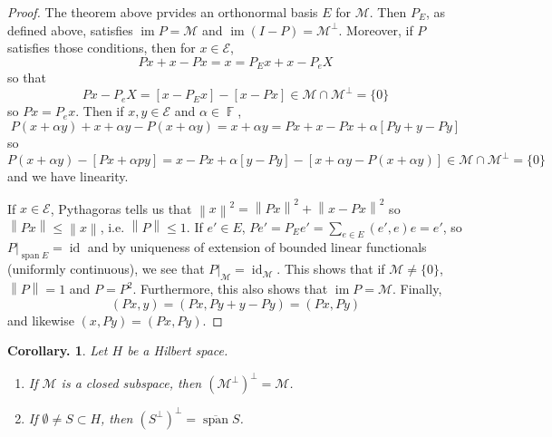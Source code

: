 \documentclass[11pt, a4paper]{memoir}
\DeclareMathOperator{\F}{{\mathbb{F}}}
\newcommand{\norm}[1]{\ensuremath{\left\lVert#1\right\rVert}}
\theoremstyle{change}
\newtheorem{corollary}[theorem]{Corollary.}
\theoremstyle{plain}
\theoremstyle{nonumberplain}
\newtheorem{proof}{Proof}
\DeclareMathOperator{\id}{id}
\DeclareMathOperator{\im}{im}
\DeclareMathOperator{\spn}{span}
\newcommand{\inr}[1]{\ensuremath{\left(#1\right)}}
\numberwithin{equation}{section}
\begin{document}
\begin{proof}
    The theorem above prvides an orthonormal basis $E$ for $\mathcal{M}$.
    Then $P_E$, as defined above, satisfies $\im P=\mathcal{M}$ and $\im(I-P)=\mathcal{M}^\perp$.
    Moreover, if $P$ satisfies those conditions, then for $x\in\mathcal{E}$,
    \begin{equation*}
        Px+x-Px=x=P_Ex+x-P_eX
    \end{equation*}
    so that
    \begin{equation*}
        Px-P_eX=[x-P_Ex]-[x-Px]\in\mathcal{M}\cap\mathcal{M}^\perp=\{0\}
    \end{equation*}
    so $Px=P_ex$.
    Then if $x,y\in\mathcal{E}$ and $\alpha\in\F$,
    \begin{equation*}
        P(x+\alpha y)+x+\alpha y-P(x+\alpha y)=x+\alpha y=Px+x-Px+\alpha[Py+y-Py]
    \end{equation*}
    so
    \begin{equation*}
        P(x+\alpha y)-[Px+\alpha py]=x-Px+\alpha[y-Py]-[x+\alpha y-P(x+\alpha y)]\in\mathcal{M}\cap\mathcal{M}^\perp=\{0\}
    \end{equation*}
    and we have linearity.

    If $x\in\mathcal{E}$, Pythagoras tells us that $\norm{x}^2=\norm{Px}^2+\norm{x-Px}^2$ so $\norm{Px}\leq\norm{x}$, i.e. $\norm{P}\leq 1$.
    If $e'\in E$, $Pe'=P_Ee'=\sum_{e\in E}\inr{e',e}e=e'$, so $P|_{\spn E}=\id$ and by uniqueness of extension of bounded linear functionals (uniformly continuous), we see that $P|_{\mathcal{M}}=\id_{\mathcal{M}}$.
    This shows that if $\mathcal{M}\neq\{0\}$, $\norm{P}=1$ and $P=P^2$.
    Furthermore, this also shows that $\im P=\mathcal{M}$.
    Finally,
    \begin{equation*}
        \inr{Px,y}=\inr{Px,Py+y-Py}=\inr{Px,Py}
    \end{equation*}
    and likewise $\inr{x,Py}=\inr{Px,Py}$.
\end{proof}
\begin{corollary}
    Let $H$ be a Hilbert space.
    \begin{enumerate}[nl,r]
        \item If $\mathcal{M}$ is a closed subspace, then $(\mathcal{M}^\perp)^\perp=\mathcal{M}$.
        \item If $\emptyset\neq S\subset H$, then $(S^\perp)^\perp=\overline{\spn}S$.
    \end{enumerate}
\end{corollary}
\end{document}
